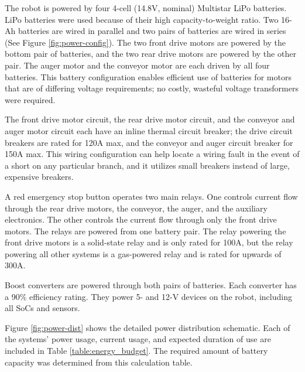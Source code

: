 \documentclass[class=article, crop=false]{standalone}
\begin{document}
	The robot is powered by four 4-cell (14.8V, nominal) Multistar LiPo batteries. LiPo batteries were used because of their high capacity-to-weight ratio. Two 16-Ah batteries are wired in parallel and two pairs of batteries are wired in series (See Figure \ref{fig:power-config}). The two front drive motors are powered by the bottom pair of batteries, and the two rear drive motors are powered by the other pair. The auger motor and the conveyor motor are each driven by all four batteries. This battery configuration enables efficient use of batteries for motors that are of differing voltage requirements; no costly, wasteful voltage transformers were required. 

	The front drive motor circuit, the rear drive motor circuit, and the conveyor and auger motor circuit each have an inline thermal circuit breaker; the drive circuit breakers are rated for 120A max, and the conveyor and auger circuit breaker for 150A max. This wiring configuration can help locate a wiring fault in the event of a short on any particular branch, and it utilizes small breakers instead of large, expensive breakers. 

	A red emergency stop button operates two main relays. One controls current flow through the rear drive motors, the conveyor, the auger, and the auxiliary electronics. The other controls the current flow through only the front drive motors. The relays are powered from one battery pair. The relay powering the front drive motors is a solid-state relay and is only rated for 100A, but the relay powering all other systems is a gas-powered relay and is rated for upwards of 300A. 

	Boost converters are powered through both pairs of batteries. Each converter has a 90\% efficiency rating. They power 5- and 12-V devices on the robot, including all SoCs and sensors.
	
	Figure \ref{fig:power-dist} shows the detailed power distribution schematic. Each of the systems’ power usage, current usage, and expected duration of use are included in Table \ref{table:energy_budget}. The required amount of battery capacity was determined from this calculation table. 
	
\end{document}
